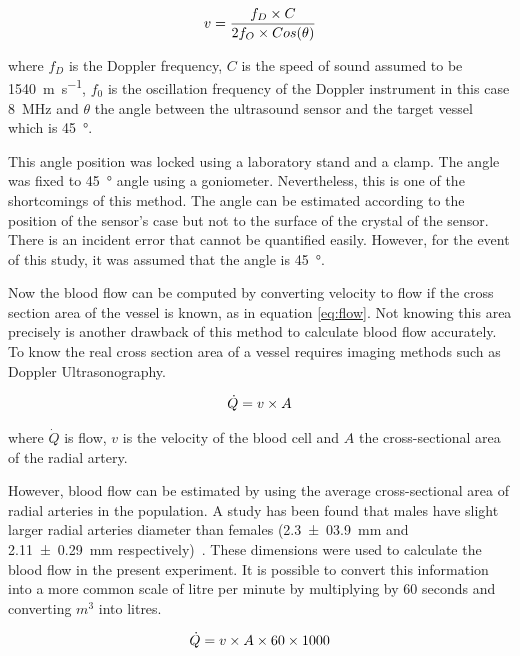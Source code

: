 \begin{align}
	\label{eq:doppler}
	v = \frac{f_D \times C}{2 f_O \times Cos(\theta)} \tagaddtext{[\si{\meter\per\second}]}
\end{align}

where $f_D$ is the Doppler frequency, $C$ is the speed of sound assumed to be \SI{1540}{\meter\per\second}, $f_0$ is the oscillation frequency of the Doppler instrument in this case \SI{8}{\mega\hertz} and $\theta$ the angle between the ultrasound sensor and the target vessel which is \SI{45}{\degree}.

This angle position was locked using a laboratory stand and a clamp. The angle was fixed to \SI{45}{\degree} angle using a goniometer. Nevertheless, this is one of the shortcomings of this method. The angle can be estimated according to the position of the sensor's case but not to the surface of the crystal of the sensor. There is an incident error that cannot be quantified easily. However, for the event of this study, it was assumed that the angle is \SI{45}{\degree}.

Now the blood flow can be computed by converting velocity to flow if the cross section area of the vessel is known, as in equation \ref{eq:flow}. Not knowing this area precisely is another drawback of this method to calculate blood flow accurately. To know the real cross section area of a vessel requires imaging methods such as Doppler Ultrasonography. 

\begin{align}
	\label{eq:flow}
	\dot{Q} = v \times A \tagaddtext{[\si{\cubic\meter\per\second}]}
\end{align}

where $\dot{Q}$ is flow, $v$ is the velocity of the blood cell and $A$ the cross-sectional area of the radial artery.

However, blood flow can be estimated by using the average cross-sectional area of radial arteries in the population. A study has been found that males have slight larger radial arteries diameter than females (\SI{2.3(039)}{\mm} and \SI{2.11(029)}{\mm} respectively)~\cite{ashraf2010size}. These dimensions were used to calculate the blood flow in the present experiment. It is possible to convert this information into a more common scale of litre per minute by multiplying by 60 seconds and converting $m^3$ into litres. 

\begin{align}
\label{eq:flow_l/min}
\dot{Q} = v \times A \times 60 \times 1000 \tagaddtext{[\si{\cubic\meter\per\second}]}
\end{align}

